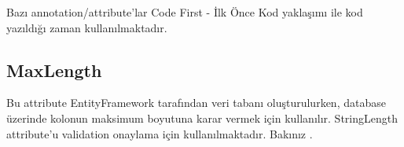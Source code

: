 \documentclass[10pt,a4paper]{article}
\begin{document}
Bazı annotation/attribute'lar Code First - İlk Önce Kod yaklaşımı ile
kod yazıldığı zaman kullanılmaktadır.

\subsection{MaxLength}
Bu attribute EntityFramework tarafından veri tabanı oluşturulurken,
database üzerinde kolonun maksimum boyutuna karar vermek için kullanılır.
StringLength attribute'u validation onaylama için kullanılmaktadır.
Bakınız \cite{StackOverflow2011StringLength}.








% 

\end{document}
